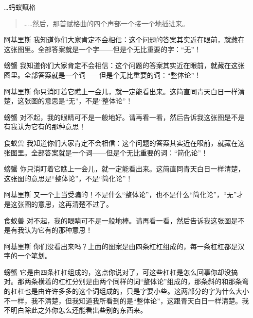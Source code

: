 
\begin{dialog}{…蚂蚁赋格}\label{dialog:ant-fugue}

\begin{quote}
……然后，那首赋格曲的四个声部一个接一个地插进来。
\end{quote}

\begin{dialogue}

\item[阿基里斯]我知道你们大家肯定不会相信：这个问题的答案其实近在眼前，就藏在这张图里。全部答案就是一个字——但是个无比重要的字：“无”！

\item[螃蟹]我知道你们大家肯定不会相信：这个问题的答案其实近在眼前，就藏在这张图里。全部答案就是一个词——但是个无比重要的词：“整体论”！

\item[阿基里斯]你只消盯着它瞧上一会儿，就一定能看出来。这简直同青天白日一样清楚，这张图的意思是“无”，不是“整体论”！

\item[螃蟹]对不起，我的眼睛可不是一般地好。请再看一看，然后告诉我这张图是不是有我认为它有的那种意思！

\item[食蚁兽]我知道你们大家肯定不会相信：这个问题的答案其实近在眼前，就藏在这张图里。全部答案就是一个词——但是个无比重要的词：“简化论”！

\item[螃蟹]你只消盯着它瞧上一会儿，就一定能看出来。这简直同青天白日一样清楚，这张图的意思是“整体论”，不是“简化论”！

\item[阿基里斯]又一个上当受骗的！不是什么“整体论”，也不是什么“简化论”，“无”才是这张图的意思，这再清楚不过了。

\item[食蚁兽]对不起，我的眼睛可不是一般地棒。请再看一看，然后告诉我这张图是不是有我认为它有的那种意思！

\item[阿基里斯]你们没看出来吗？上面的图案是由四条杠杠组成的，每一条杠杠都是汉字的一个笔划。

\item[螃蟹]它是由四条杠杠组成的，这点你说对了，可这些杠杠是怎么回事你却没搞对。那两条横着的杠杠分别是由两个同样的词“整体论”组成的，那条斜的和那条弯的杠杠也是由许许多多的这个词组成的，只是字要小些。这两部分的字为什么大小不一样，我不清楚，但我知道我所看到的是“整体论”，这跟青天白日一样清楚。我不明白除此之外你怎么还能看出些别的东西来。


\end{dialogue}
\end{dialog}
